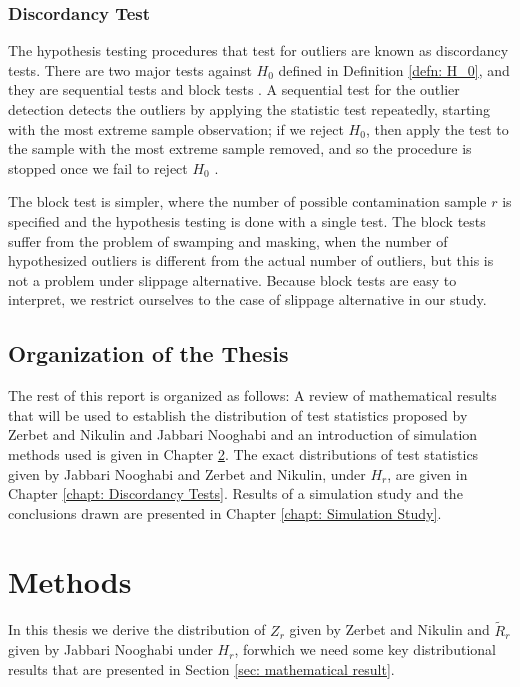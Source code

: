 \documentclass{report}
\begin{document}
\subsection{Discordancy Test}
The hypothesis testing procedures that test for outliers are known as discordancy tests. There are two major tests against $H_0$ defined in
Definition \ref{defn: H_0}, and they are sequential tests and block tests \cite{barnett1984outliers}. A sequential test for the outlier detection detects the outliers by applying the
statistic test repeatedly, starting with the most extreme sample observation; if we reject $H_0$, then apply the test to the sample with
the most extreme sample removed, and so the procedure is stopped once we fail to reject $H_0$ \cite{rosner1975detection}.

The block test is simpler, where the number of possible contamination sample $r$ is specified and the hypothesis testing is done with
a single test. The block tests suffer from the problem of swamping and masking, when the
number of hypothesized outliers is different from the actual number of outliers, but this is not a problem under slippage alternative. Because block tests are easy to
interpret, we restrict ourselves to the case of slippage alternative in our study.

\section{Organization of the Thesis}
The rest of this report is organized as follows: A review of mathematical results that will be used
to establish the distribution of test statistics proposed by Zerbet and Nikulin\cite{zerbet2003new} and
Jabbari Nooghabi\cite{jabbari2019detecting} and an introduction of simulation methods used is given in Chapter \ref{chapt: Methods}. The exact distributions of test statistics given by Jabbari Nooghabi and Zerbet and Nikulin, under $H_r$,
are given in Chapter \ref{chapt: Discordancy Tests}. Results of a simulation study and the conclusions drawn are presented in Chapter \ref{chapt: Simulation Study}.


\chapter{Methods} \label{chapt: Methods}

In this thesis we derive the distribution of $Z_r$ given by
Zerbet and Nikulin\cite{zerbet2003new} and $\tilde R_r$ given by Jabbari Nooghabi \cite{jabbari2019detecting} under $H_r$, 
forwhich we need some key distributional results that are presented in Section \ref{sec: mathematical result}. 
\end{document}
